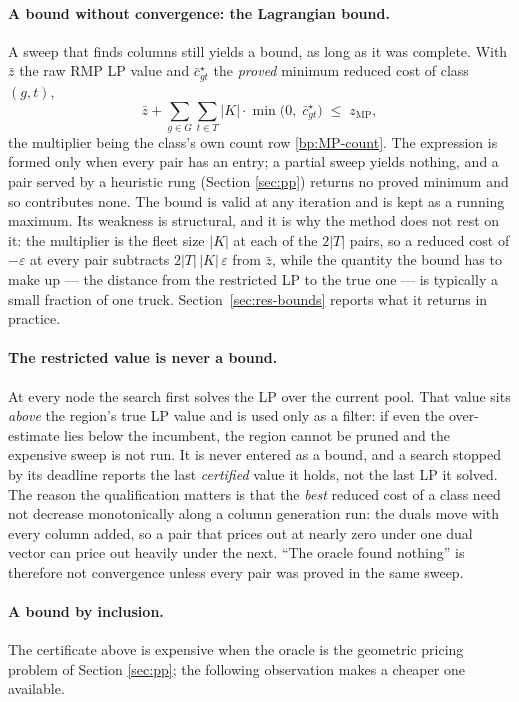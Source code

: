 \paragraph{A bound without convergence: the Lagrangian bound.}
A sweep that finds columns still yields a bound, as long as it was
complete. With $\bar z$ the raw RMP LP value and $\bar c^{\star}_{gt}$
the \emph{proved} minimum reduced cost of class $(g,t)$,
\begin{equation}
  \bar z+\sum_{g\in G}\sum_{t\in T}
         |K|\cdot\min\bigl(0,\;\bar c^{\star}_{gt}\bigr)
  \;\le\;z_{\mathrm{MP}},
\label{eq:lagr}
\end{equation}
the multiplier being the class's own count row \eqref{bp:MP-count}. The
expression is formed only when every pair has an entry; a partial sweep
yields nothing, and a pair served by a heuristic rung (Section
\ref{sec:pp}) returns no proved minimum and so contributes none. The
bound is valid at any iteration and is kept as a running maximum. Its
weakness is structural, and it is why the method does not rest on it:
the multiplier is the fleet size $|K|$ at each of the $2|T|$ pairs, so a
reduced cost of $-\varepsilon$ at every pair subtracts
$2|T|\,|K|\,\varepsilon$ from $\bar z$, while the quantity the bound
has to make up --- the distance from the restricted LP to the true one
--- is typically a small fraction of one truck.
Section~\ref{sec:res-bounds} reports what it returns in practice.

\paragraph{The restricted value is never a bound.}
At every node the search first solves the LP over the current pool.
That value sits \emph{above} the region's true LP value and is used
only as a filter: if even the over-estimate lies below the incumbent,
the region cannot be pruned and the expensive sweep is not run. It is
never entered as a bound, and a search stopped by its deadline reports
the last \emph{certified} value it holds, not the last LP it solved.
The reason the qualification matters is that the \emph{best} reduced
cost of a class need not decrease monotonically along a column
generation run: the duals move with every column added, so a pair that
prices out at nearly zero under one dual vector can price out heavily
under the next. ``The oracle found nothing'' is therefore not
convergence unless every pair was proved in the same sweep.

\paragraph{A bound by inclusion.}
The certificate above is expensive when the oracle is the geometric
pricing problem of Section \ref{sec:pp}; the following observation makes
a cheaper one available.

